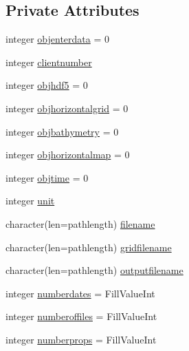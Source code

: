 \subsection*{Private Attributes}
\begin{DoxyCompactItemize}
\item 
integer \mbox{\hyperlink{structmodulegfsasciiwind_1_1t__gfsasciiwind_a6cf3525069ced4ed4eab37ead8ac1273}{objenterdata}} = 0
\item 
integer \mbox{\hyperlink{structmodulegfsasciiwind_1_1t__gfsasciiwind_ae8dc6c932a04750b0c6cc73dacd5230c}{clientnumber}}
\item 
integer \mbox{\hyperlink{structmodulegfsasciiwind_1_1t__gfsasciiwind_a171097d632886d3624bc42bd2310ec0f}{objhdf5}} = 0
\item 
integer \mbox{\hyperlink{structmodulegfsasciiwind_1_1t__gfsasciiwind_a35a50ffab2a30c8125f57ab1c785e4f5}{objhorizontalgrid}} = 0
\item 
integer \mbox{\hyperlink{structmodulegfsasciiwind_1_1t__gfsasciiwind_a5055730e8652c21850cfd1d4c0178dc4}{objbathymetry}} = 0
\item 
integer \mbox{\hyperlink{structmodulegfsasciiwind_1_1t__gfsasciiwind_a4e7950cbffa75e4eea580e59ed9d327c}{objhorizontalmap}} = 0
\item 
integer \mbox{\hyperlink{structmodulegfsasciiwind_1_1t__gfsasciiwind_acb19db47f4d48999005dfd0195cb225c}{objtime}} = 0
\item 
integer \mbox{\hyperlink{structmodulegfsasciiwind_1_1t__gfsasciiwind_ae724800fe7d0ea0aa4f81575895dc43e}{unit}}
\item 
character(len=pathlength) \mbox{\hyperlink{structmodulegfsasciiwind_1_1t__gfsasciiwind_a4c42fb5043a32e29434c83eaf5ffe407}{filename}}
\item 
character(len=pathlength) \mbox{\hyperlink{structmodulegfsasciiwind_1_1t__gfsasciiwind_a0bf840245949a35b00b392979eb5b386}{gridfilename}}
\item 
character(len=pathlength) \mbox{\hyperlink{structmodulegfsasciiwind_1_1t__gfsasciiwind_ac5b22134db17e3fcd7cad4f520f9d8e7}{outputfilename}}
\item 
integer \mbox{\hyperlink{structmodulegfsasciiwind_1_1t__gfsasciiwind_a562de2ba8fafb6217fda61a8961eb21e}{numberdates}} = Fill\+Value\+Int
\item 
integer \mbox{\hyperlink{structmodulegfsasciiwind_1_1t__gfsasciiwind_a1b36b6fd22133b2b8d296f4d622457e6}{numberoffiles}} = Fill\+Value\+Int
\item 
integer \mbox{\hyperlink{structmodulegfsasciiwind_1_1t__gfsasciiwind_adfd9a02ce903689826a4da7981f83db7}{numberprops}} = Fill\+Value\+Int

\end{DoxyCompactItemize}
